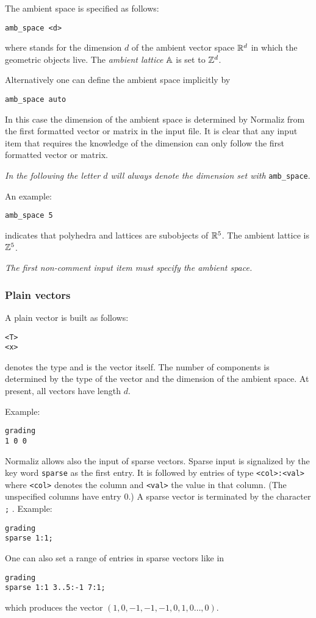 The ambient space is specified as follows:
\begin{Verbatim}
amb_space <d>
\end{Verbatim}
where  stands for the dimension $d$ of the ambient vector space $\RR^d$ in which the geometric objects live. The \emph{ambient lattice} $\AA$ is set to $\ZZ^d$.

Alternatively one can define the ambient space implicitly by
\begin{Verbatim}
amb_space auto
\end{Verbatim}
In this case the dimension of the ambient space is determined by Normaliz from the first formatted vector or matrix in the input file. It is clear that any input item that requires the knowledge of the dimension can only follow the first formatted vector or matrix.

\emph{In the following the letter $d$ will always denote the dimension set with} \verb|amb_space|.


An example:
\begin{Verbatim}
amb_space 5
\end{Verbatim}
indicates that polyhedra and lattices are subobjects of $\RR^5$. The ambient lattice is $\ZZ^5$.

\emph{The first non-comment input item must specify the ambient space.}

\subsubsection{Plain vectors}

A plain vector is built as follows:
\begin{Verbatim}
<T>
<x>
\end{Verbatim}
 denotes the type and  is the vector itself. The number of components is determined by the type of the vector and the dimension of the ambient space. At present, all vectors have length $d$.

Example:
\begin{Verbatim}
grading
1 0 0
\end{Verbatim}

Normaliz allows also the input of sparse vectors. Sparse input is signalized by the key word \verb|sparse| as the first entry. It is followed by entries of type \verb|<col>:<val>| where \verb|<col>| denotes the column and \verb|<val>| the value in that column. (The unspecified columns have entry $0$.) A sparse vector is terminated by the character \verb|;| .
Example:
\begin{Verbatim}
grading
sparse 1:1;
\end{Verbatim}
One can also set a range of entries in sparse vectors like in
\begin{Verbatim}
grading
sparse 1:1 3..5:-1 7:1;
\end{Verbatim}
which produces the vector $(1,0,-1,-1,-1,0, 1, 0 \dots,0)$.

